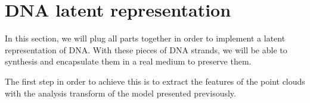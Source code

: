 
\section{DNA latent representation}

In this section, we will plug all parts together in order to implement a latent representation of DNA. With these pieces of DNA strands, we will be able to synthesis and encapsulate them in a real medium to preserve them.

The first step in order to achieve this is to extract the features of the point clouds with the analysis transform of the model presented previsously.
